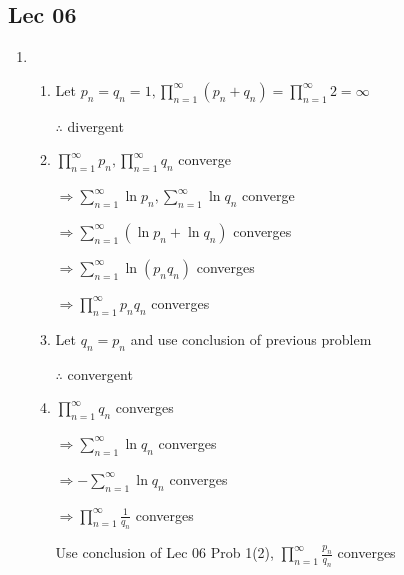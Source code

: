 \subsection{Lec 06}
    \begin{enumerate}[1]
        \item
            \begin{enumerate}[(1)]
                \item
                Let $p_n=q_n=1,\prod\limits_{n=1}^\infty (p_n+q_n)=\prod\limits_{n=1}^\infty 2 =\infty$
                \par $\therefore$ divergent

                \item
                $\prod\limits_{n=1}^\infty p_n,\prod\limits_{n=1}^\infty q_n$ converge
                \par $\Rightarrow \sum\limits_{n=1}^\infty \ln p_n,\sum\limits_{n=1}^\infty \ln q_n$ converge
                \par $\Rightarrow \sum\limits_{n=1}^\infty (\ln p_n+\ln q_n)$ converges
                \par $\Rightarrow \sum\limits_{n=1}^\infty \ln (p_nq_n)$ converges
                \par $\Rightarrow \prod\limits_{n=1}^\infty p_nq_n$ converges

                \item
                Let $q_n=p_n$ and use conclusion of previous problem
                \par $\therefore$ convergent

                \item
                $\prod\limits_{n=1}^\infty q_n$ converges
                \par $\Rightarrow \sum\limits_{n=1}^\infty \ln q_n$ converges
                \par $\Rightarrow -\sum\limits_{n=1}^\infty \ln q_n$ converges
                \par $\Rightarrow \prod\limits_{n=1}^\infty \frac{1}{q_n}$ converges
                \par Use conclusion of Lec 06 Prob 1(2), $\prod\limits_{n=1}^\infty \frac{p_n}{q_n}$ converges
            \end{enumerate}


\end{enumerate}
